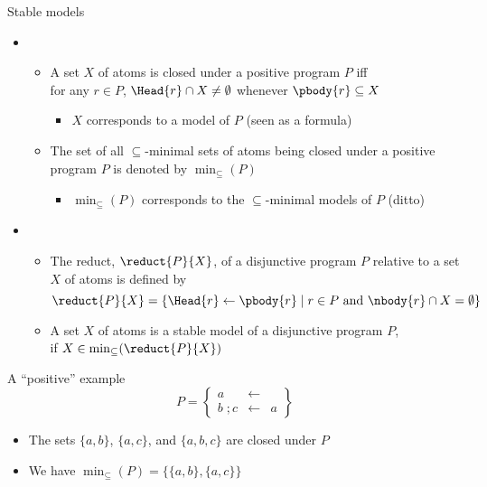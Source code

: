 \begin{frame}{Stable models}
  \begin{itemize}
    \item {}
          \begin{itemize}
            \item A set $X$ of atoms is \alert{closed under} a positive program $P$ iff
                  \\for any $r\in P$, $\Head{r}\cap X\neq\emptyset$ whenever $\pbody{r}\subseteq X$
                  \begin{itemize}
                    \item $X$ corresponds to a model of $P$ (seen as a formula)
                  \end{itemize}
            \item The set of all $\subseteq$-minimal sets of atoms being closed under a positive
                  program $P$ is denoted by $\min_\subseteq(P)$
                  \begin{itemize}
                    \item $\min_\subseteq(P)$ corresponds to the $\subseteq$-minimal models of $P$ (ditto)
                  \end{itemize}
          \end{itemize}
    \item<2-> 
          \begin{itemize}
            \item<2-> The \alert{reduct}, $\reduct{P}{X}$, of a disjunctive program $P$ relative to
                  a set $X$ of atoms is defined by
                  \[
                    \reduct{P}{X}
                    =
                    \{\Head{r}\leftarrow\pbody{r} \mid r\in P \text{ and } \nbody{r}\cap X=\emptyset\}
                  \]
            \item<3-> A set $X$ of atoms is a \alert{stable model} of a disjunctive program $P$,\\
                  if $X\in\min_\subseteq(\reduct{P}{X})$
          \end{itemize}
  \end{itemize}

\end{frame}
\begin{frame}{A ``positive'' example}
  \[
    P
    =
    \left\{
    \begin{array}{lcl}
      a     & \leftarrow &
      \\
      b\;;c & \leftarrow & a
    \end{array}
    \right\}
  \]

  \pause

  \begin{itemize}
    \item The sets $\{a,b\}$, $\{a,c\}$, and $\{a,b,c\}$ are closed under $P$
          \pause
    \item We have $\min_\subseteq(P)=\{  \{a,b\},  \{a,c\}  \}$
  \end{itemize}
\end{frame}
